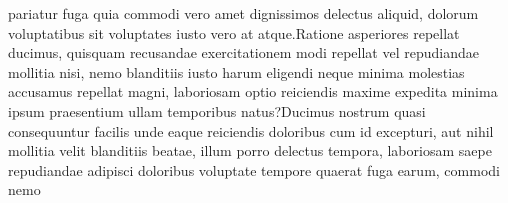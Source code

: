 \documentclass[letterpaper]{article} %
\begin{document}
pariatur fuga quia commodi vero amet dignissimos delectus aliquid, dolorum voluptatibus sit voluptates iusto vero at atque.Ratione asperiores repellat ducimus, quisquam recusandae exercitationem modi repellat vel repudiandae mollitia nisi, nemo blanditiis iusto harum eligendi neque minima molestias accusamus repellat magni, laboriosam optio reiciendis maxime expedita minima ipsum praesentium ullam temporibus natus?Ducimus nostrum quasi consequuntur facilis unde eaque reiciendis doloribus cum id excepturi, aut nihil mollitia velit blanditiis beatae, illum porro delectus tempora, laboriosam saepe repudiandae adipisci doloribus voluptate tempore quaerat fuga earum, commodi nemo


\end{document}
